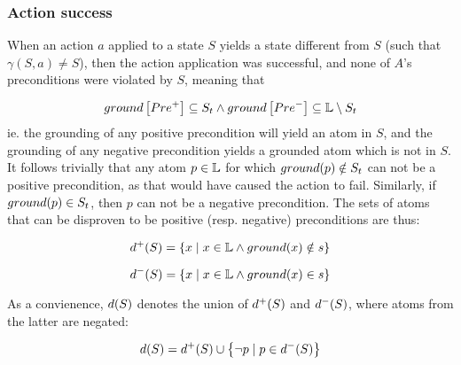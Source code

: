 \documentclass[\master/Master.tex]{subfiles}
\begin{document}
\subsubsection*{Action success}
When an action $a$ applied to a state $S$ yields a state different from $S$ (such that $\gamma (S, a) \neq S$), then the action application was successful, and none of $A$'s preconditions were violated by $S$, meaning that

        \[ ground\left[Pre^+\right] \subseteq S_t \land
            ground\left[Pre^-\right] \subseteq \mathbb{L} \setminus S_t
        \]
ie. the grounding of any positive precondition will yield an atom in $S$, and the grounding of any negative precondition yields a grounded atom which is not in $S$.
It follows trivially that any atom $p \in \mathbb{L}$ for which $ ground(p) \notin S_t$ can not be a positive precondition, as that would have caused the action to fail. Similarly, if $ground(p) \in S_t$, then $p$ can not be a negative precondition. The sets of atoms that can be disproven to be positive (resp. negative) preconditions are thus:

\begin{equation*} \label{eq:DPlusTrans}
    d^+ (S) = \left\{ x \; | \; x \in \mathbb{L} \land ground(x) \notin s \right\}
\end{equation*}

\begin{equation*} \label{eq:DMinusTrans}
    d^- (S) = \left\{ x \; | \; x \in \mathbb{L} \land ground(x) \in s \right\}
\end{equation*}

As a convienence, $d(S)$ denotes the union of $d^+(S)$ and $d^-(S)$, where atoms from the latter are negated:

\begin{equation*}
    d(S) = d^+ (S) \cup \left\{ \neg p \; | \; p \in d^-(S) \right\}
\end{equation*}
\end{document}
